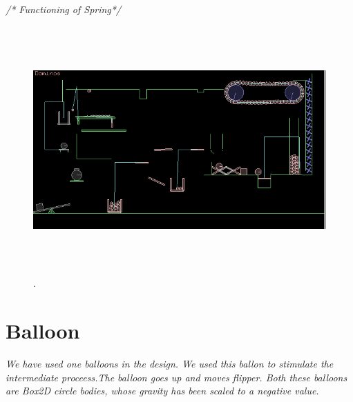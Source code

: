 \documentclass[a4paper]{article}
\begin{document}
\begin{flushleft}
\begin{itemize}
	\newpage
	\begin{center}
		\textit{/* Functioning of Spring*/}
	\end{center}
		\vspace{-25pt}
		\begin{figure}[H]
		\centering
		\vspace{20pt}
		\includegraphics[width=180mm,height=95mm]{3}.
		\end{figure}
	
	\section{Balloon}
	\vspace{-10pt}
	\large\textit{We have used one balloons in the design. We used this ballon to stimulate the intermediate proceess.The balloon goes up and moves flipper. Both these balloons are Box2D circle bodies, whose gravity has been scaled to a negative value.}
			

\end{itemize}
\end{flushleft}
\end{document}
